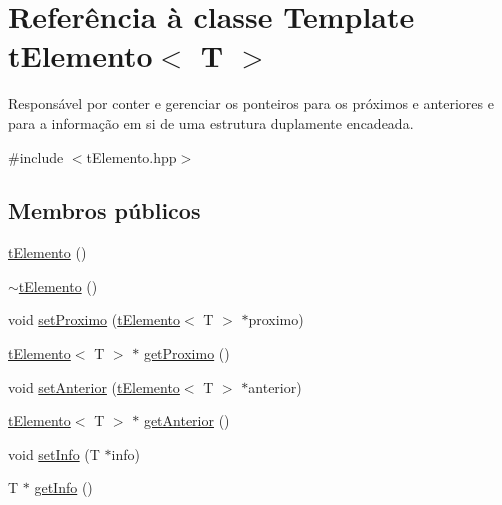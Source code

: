 \hypertarget{classt_elemento}{\section{Referência à classe Template t\+Elemento$<$ T $>$}
\label{classt_elemento}
}


Responsável por conter e gerenciar os ponteiros para os próximos e anteriores e para a informação em si de uma estrutura duplamente encadeada.  




{\ttfamily \#include $<$t\+Elemento.\+hpp$>$}

\subsection*{Membros públicos}
\begin{DoxyCompactItemize}
\item 
\hyperlink{classt_elemento_ad8dc84de43eca107440039b37e188de6}{t\+Elemento} ()
\item 
\hyperlink{classt_elemento_a2b83968c3cdf56f521b6faff78068bc8}{$\sim$t\+Elemento} ()
\item 
void \hyperlink{classt_elemento_aa9f5f970a2de51063c78e54229c35867}{set\+Proximo} (\hyperlink{classt_elemento}{t\+Elemento}$<$ T $>$ $\ast$proximo)
\item 
\hyperlink{classt_elemento}{t\+Elemento}$<$ T $>$ $\ast$ \hyperlink{classt_elemento_acfbfbaaedb5a662a999f655c171b50f1}{get\+Proximo} ()
\item 
void \hyperlink{classt_elemento_a484d3f94a793fc00e935a2d442019ac4}{set\+Anterior} (\hyperlink{classt_elemento}{t\+Elemento}$<$ T $>$ $\ast$anterior)
\item 
\hyperlink{classt_elemento}{t\+Elemento}$<$ T $>$ $\ast$ \hyperlink{classt_elemento_a467573ea5ebe5fdd5e5739f62d8ecc7d}{get\+Anterior} ()
\item 
void \hyperlink{classt_elemento_a20c8ed616c72b00387650d06a8368834}{set\+Info} (T $\ast$info)
\item 
T $\ast$ \hyperlink{classt_elemento_af7e39d1f741ccf80a012660530a32e1b}{get\+Info} ()
\end{DoxyCompactItemize}


